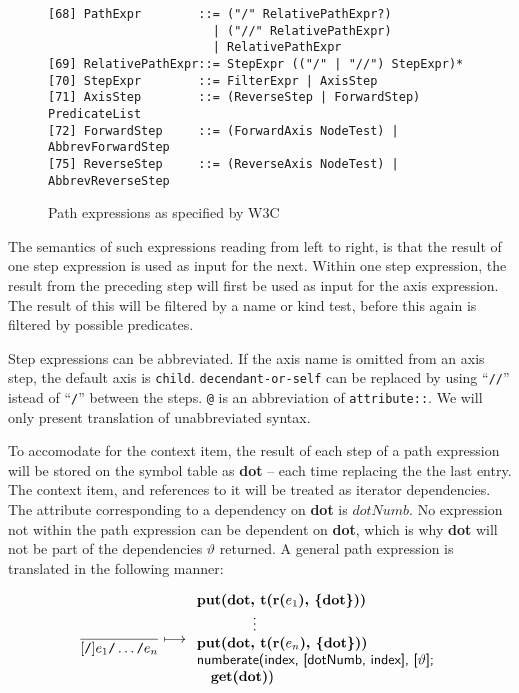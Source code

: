 \begin{figure}[h]
\begin{Verbatim}
[68] PathExpr        ::= ("/" RelativePathExpr?)
                       | ("//" RelativePathExpr)
                       | RelativePathExpr
[69] RelativePathExpr::= StepExpr (("/" | "//") StepExpr)*
[70] StepExpr        ::= FilterExpr | AxisStep
[71] AxisStep        ::= (ReverseStep | ForwardStep) PredicateList
[72] ForwardStep     ::= (ForwardAxis NodeTest) | AbbrevForwardStep
[75] ReverseStep     ::= (ReverseAxis NodeTest) | AbbrevReverseStep
\end{Verbatim}
\caption{Path expressions as specified by W3C\cite{w3c00} \label{fig:trans:TD:pathEBNF}}
\end{figure}
The semantics of such expressions reading from left to right, is that the result of one step expression is used as
input for the next. Within one step expression, the result from the preceding step will first be used as input for the
axis expression. The result of this will be filtered by a name or kind test, before this again is filtered by
possible predicates.

Step expressions can be abbreviated. If the axis name is omitted from an axis step, the default axis is
\texttt{child}. \texttt{decendant-or-self} can be replaced by using ``\texttt{//}'' istead of ``\texttt{/}''
between the steps. \texttt{@} is an abbreviation of \texttt{attribute::}. We will only present translation of
unabbreviated syntax.

To accomodate for the context item, the result of each step of a path expression will be stored on the symbol
table as \textbf{dot} -- each time replacing the the last entry. The context item, and references to it will be
treated as iterator dependencies. The attribute corresponding to a dependency on \textbf{dot} is $dotNumb$. No
expression not within the path expression can be dependent on \textbf{dot},
which is why \textbf{dot} will not be part of the dependencies $\vartheta$ returned. A general path expression is translated in the following manner:

\begin{equation}
\frac{}{[\mbox{\texttt{/}}]e_1\mbox{\texttt{/}}\ldots\mbox{\texttt{/}}e_n} \longmapsto
\begin{array}{l}
\mbox{\textbf{put(dot, t(r(}}e_1\mbox{\textbf{), \{dot\}))}} \\
\qquad \qquad \vdots \\
\mbox{\textbf{put(dot, t(r(}}e_n\mbox{\textbf{), \{dot\}))}} \\
\mbox{\textsf{numberate(index, [dotNumb, index], [}}\vartheta\mbox{\textsf{];}} \\ \quad
\mbox{\textbf{get(dot)}\textsf{)}}
\end{array}
\label{rule:trans:TD:pathExpr}
\end{equation} 

